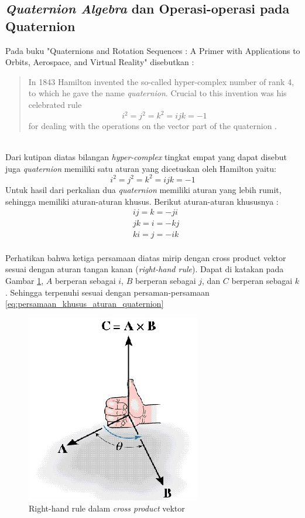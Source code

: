 \subsection{\textit{Quaternion Algebra} dan Operasi-operasi pada Quaternion}
\cite{kuipers:1999}Pada buku "Quaternions and Rotation Sequences : A Primer with Applications to Orbits, Aerospace, and Virtual Reality" disebutkan :
\begin{quote}
In 1843 Hamilton invented the so-called hyper-complex number of rank 4, to which he gave the name \textit{quaternion}. Crucial to this invention was his celebrated rule
\[
	i^2 = j^2 = k^2 = ijk = -1
\]
for dealing with the operations on the vector part of the quaternion .
\end{quote}\cite{kuipers:1999}\\
Dari kutipan diatas bilangan \textit{hyper-complex} tingkat empat yang dapat disebut juga \textit{quaternion} memiliki satu aturan yang dicetuskan oleh Hamilton yaitu:
\[
	i^2 = j^2 = k^2 = ijk = -1
\]
Untuk hasil dari perkalian dua \textit{quaternion} memiliki aturan yang lebih rumit, sehingga memiliki aturan-aturan khusus. Berikut aturan-aturan khususnya :
\begin{equation}
	\begin{split}
	& ij = k = -ji\\
	& jk = i = -kj\\
	& ki = j = -ik	
	\end{split}
\label{eq:persamaan_khusus_aturan_quaternion}
\end{equation}\\
Perhatikan bahwa ketiga persamaan diatas mirip dengan cross product vektor sesuai dengan aturan tangan kanan (\textit{right-hand rule}). Dapat di katakan pada Gambar \ref{fig:right-hand-rule}, \(A\) berperan sebagai \(i\), \(B\) berperan sebagai \(j\), dan \(C\) berperan sebagai \(k\). Sehingga terpenuhi sesuai dengan persaman-persamaan \ref{eq:persamaan_khusus_aturan_quaternion}\\
\begin{figure}[htbp]
\centering
\includegraphics[scale=1]{Gambar/right-hand-rule}
\caption{Right-hand rule dalam \textit{cross product} vektor} 
\label{fig:right-hand-rule}
\end{figure}\\
